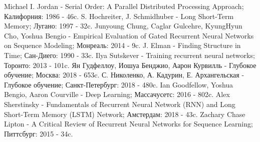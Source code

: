 \documentclass[a4paper,russian]{article}
\begin{document}
\newpage

	
	\begin{thebibliography}{}
		  Michael I. Jordan	-	Serial Order: A Parallel Distributed Processing Approach; Калифорния: 1986 - 46c. 
		  S. Hochreiter, J. Schmidhuber	-	Long Short-Term Memory; Лугано: 1997 - 32c.
		  Junyoung Chung, Caglar Gulcehre, KyungHyun Cho, Yoshua Bengio	-	Empirical Evaluation of Gated Recurrent Neural Networks on Sequence Modeling; Монреаль: 2014 - 9c.
		 J. Elman	-	Finding Structure in Time; Сан-Диего:  1990 - 33c.
		 Ilya Sutskever	-	Training recurrent neural networks; Торонто: 2013 - 101c.
		 Ян Гудфеллоу, Иошуа Бенджио, Аарон Курвилль	-	Глубокое обучение; Москва: 2018 - 653c. 
		 С. Николенко, А. Кадурин, Е. Архангельская	-	Глубокое обучение;  Санкт-Петербург: 2018 - 480c.
		 Ian Goodfellow, Yoshua Bengio, Aaron Courville	-	Deep Learning; Массачусетс: 2016 - 802c.
		 Alex Sherstinsky	-	Fundamentals of Recurrent Neural Network (RNN) and Long Short-Term Memory (LSTM) Network; Амстердам: 2018 - 43c.
		 Zachary Chase Lipton	-	A Critical Review of Recurrent Neural Networks for Sequence Learning; Питтсбург: 2015 - 34c.
	\end{thebibliography}
\end{document}
